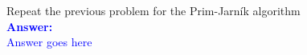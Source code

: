 \item{}
Repeat the previous problem for the Prim-Jarn\'{i}k algorithm\\[12pt]
\ifanswers
\textcolor{blue}{
\textbf{Answer:}\\[6pt]
Answer goes here
}
\newpage
\fi
